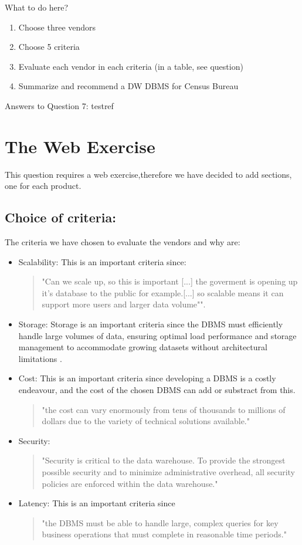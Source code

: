What to do here?
\begin{enumerate}
    \item Choose three vendors
    \item Choose 5 criteria
    \item Evaluate each vendor in each criteria (in a table, see question)
    \item Summarize and recommend a DW DBMS for Census Bureau
  \end{enumerate}
\newpage Answers to Question 7:
testref \cite{benchmark}
\section{The Web Exercise}
This question requires a web exercise,therefore we have decided to add sections, one for each product. 

\subsection{Choice of criteria:}
The criteria we have chosen to evaluate the vendors and why are:
\begin{itemize}
    \item Scalability: This is an important criteria since:
    \begin{quotation}
        "Can we scale up, so this is important [...] the goverment is opening up it's database to the public for example.[...] so scalable means it can support more users and larger data volume"\cite[t.00:53:00]{l1video}".
    \end{quotation}
    \item Storage: Storage is an important criteria since
    the DBMS must efficiently handle large volumes of data, 
    ensuring optimal load performance and storage management to 
    accommodate growing datasets without architectural limitations \cite[p. 1239]{CourseLitt}.
    \item Cost: This is an important criteria since developing a DBMS is a costly endeavour, and the cost of the chosen DBMS can add or substract from this. \begin{quotation}
        "the cost can vary enormously from tens of thousands to millions of dollars due to
    the variety of technical solutions available." \cite[p. 1226]{CourseLitt}
    \end{quotation}
    \item Security: \begin{quote}
        "Security is critical to the data warehouse. To provide the strongest possible
security and to minimize administrative overhead, all security policies are enforced
within the data warehouse."\cite[p. 1309]{CourseLitt}
    \end{quote}
    \item Latency: This is an important criteria since \begin{quotation}
         "the DBMS must be able to handle large, complex queries for key business operations that must complete in reasonable time periods." \cite[p. 1239]{CourseLitt}
    \end{quotation} 
\end{itemize}
